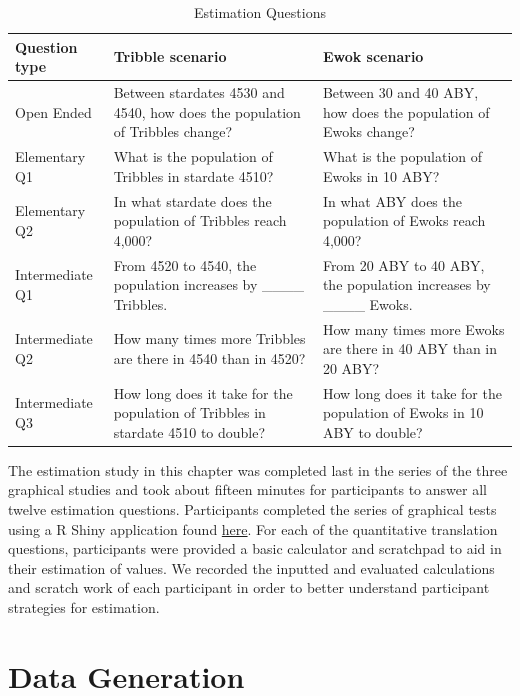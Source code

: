 \documentclass[print]{nuthesis}
\begin{document}
\begin{table}

\caption{\label{tab:estimation-questions-table}Estimation Questions}
\centering
\begin{tabular}[t]{l>{\raggedright\arraybackslash}p{10em}>{\raggedright\arraybackslash}p{10em}}
\toprule
Question type & Tribble scenario & Ewok scenario\\
\midrule
Open Ended & Between stardates 4530 and 4540, how does the population of Tribbles change? & Between 30 and 40 ABY, how does the population of Ewoks change?\\
Elementary Q1 & What is the population of Tribbles in stardate 4510? & What is the population of Ewoks in 10 ABY?\\
Elementary Q2 & In what stardate does the population of Tribbles reach 4,000? & In what ABY does the population of Ewoks reach 4,000?\\
Intermediate Q1 & From 4520 to 4540, the population increases by \_\_\_\_ Tribbles. & From 20 ABY to 40 ABY, the population increases by \_\_\_\_ Ewoks.\\
Intermediate Q2 & How many times more Tribbles are there in 4540 than in 4520? & How many times more Ewoks are there in 40 ABY than in 20 ABY?\\
\addlinespace
Intermediate Q3 & How long does it take for the population of Tribbles in stardate 4510 to double? & How long does it take for the population of Ewoks in 10 ABY to double?\\
\bottomrule
\end{tabular}
\end{table}

The estimation study in this chapter was completed last in the series of the three graphical studies and took about fifteen minutes for participants to answer all twelve estimation questions.
Participants completed the series of graphical tests using a R Shiny application found \href{https://shiny.srvanderplas.com/perception-of-statistical-graphics/}{here}.
For each of the quantitative translation questions, participants were provided a basic calculator and scratchpad to aid in their estimation of values.
We recorded the inputted and evaluated calculations and scratch work of each participant in order to better understand participant strategies for estimation.

\hypertarget{data-generation-3}{%
\section{Data Generation}\label{data-generation-3}}
\end{document}
